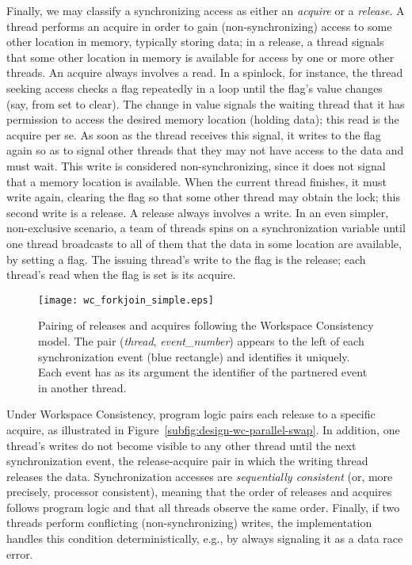 Finally, we may classify a synchronizing access as either an \textit{acquire} or a \textit{release}.  A thread performs an acquire in order to gain (non-synchronizing) access to some other location in memory, typically storing data; in a release, a thread signals that some other location in memory is available for access by one or more other threads.  An acquire always involves a read.  In a spinlock, for instance, the thread seeking access checks a flag repeatedly in a loop until the flag's value changes (say, from set to clear).  The change in value signals the waiting thread that it has permission to access the desired memory location (holding data); this read is the acquire per se.  As soon as the thread receives this signal, it writes to the flag again so as to signal other threads that they may not have access to the data and must wait.  This write is considered non-synchronizing, since it does not signal that a memory location is available.  When the current thread finishes, it must write again, clearing the flag so that some other thread may obtain the lock; this second write is a release.   A release always involves a write.  In an even simpler, non-exclusive scenario, a team of threads spins on a synchronization variable until one thread broadcasts to all of them that the data in some location are available, by setting a flag.  The issuing thread's write to the flag is the release; each thread's read when the flag is set is its acquire.

\begin{figure}[tbp]
\begin{center}
\texttt{[image: wc\_forkjoin\_simple.eps]}
\caption{Pairing of releases and acquires following the Workspace Consistency model.
The pair (\textit{thread}, \textit{event\_number}) appears to the left of each synchronization event (blue rectangle) and identifies it uniquely.  Each event has as its argument the identifier of the partnered event in another thread.}
\label{fig:design-wc-forkjoin-simple}
\end{center}
\end{figure}

Under Workspace Consistency, program logic pairs each release to a specific acquire, as illustrated in Figure~\ref{subfig:design-wc-parallel-swap}.  In addition, one thread's writes do not become visible to any other thread until the next synchronization event, the release-acquire pair in which the writing thread releases the data.  Synchronization accesses are \textit{sequentially consistent} (or, more precisely, processor consistent), meaning that the order of releases and acquires follows program logic and that all threads observe the same order.  Finally, if two threads perform conflicting (non-synchronizing) writes, the implementation handles this condition deterministically, e.g., by always signaling it as a data race error.

